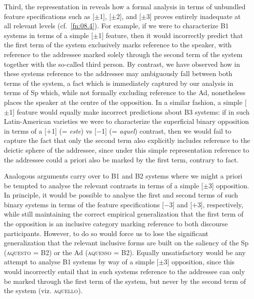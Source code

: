 \documentclass[output=paper]{langsci/langscibook}
\begin{document}
Third, the representation in  reveals how a formal analysis
in terms of unbundled feature specifications such as [${\pm}$1], [${\pm}$2],
and [${\pm}$3] proves entirely inadequate at all relevant levels (cf.\
\cref{fn:08.4}).  For example, if we were to characterize B1 systems
in terms of a simple [$\pm$1] feature, then it would incorrectly predict that the
first term of the system exclusively marks reference to the speaker, with
reference to the addressee marked solely through the second term of the system
together with the so-called third person. By contrast, we have observed how in
these systems reference to the addressee may ambiguously fall between both
terms of the system, a fact which is immediately captured by our analysis in
terms of Sp which, while not formally excluding reference to the Ad,
nonetheless places the speaker at the centre of the opposition. In a similar
fashion, a simple [$\pm$1] feature would equally make incorrect predictions about
B3 systems: if in such Latin-American \ili{Spanish} varieties we were to
characterize the superficial binary opposition in terms of a [$+$1] (=
\emph{este}) vs [$-$1] (= \emph{aquel}) contrast, then we would fail to capture
the fact that only the second term also explicitly includes reference to the
deictic sphere of the addressee, since under this simple representation
reference to the addressee could a priori also be marked by the first
term, contrary to fact.

Analogous arguments carry over to B1 and B2 systems where we might
a priori be tempted to analyse the relevant contrasts in terms of a
simple [$\pm$3] opposition. In principle, it would be possible to analyse the first
and second terms of such binary systems in terms of the feature specifications
[$-$3] and [$+$3], respectively, while still maintaining the correct empirical
generalization that the first term of the opposition is an inclusive category
marking reference to both discourse participants. However, to do so would force
us to lose the significant generalization \parencite[cf.][504f]{HarRit2002}
that the relevant inclusive forms are built on the saliency of the Sp
(\textsc{aquesto} = B2\tss{A}) or the Ad (\textsc{aquesso} = B2\tss{B}).
Equally unsatisfactory would be any attempt to analyse B1\tss{B/C} systems by
way of a simple [$\pm$3] opposition, since this would incorrectly entail that in
such systems reference to the addressee can only be marked through the first
term of the system, but never by the second term of the system (viz.
\textsc{aquello}).
\end{document}
